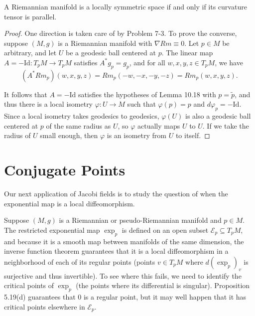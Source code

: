 \begin{theorem}
\label{thm:characterization-locally-symmetric-spaces}
A Riemannian manifold is a locally symmetric space if and only if its curvature tensor is parallel.

\begin{proof}
One direction is taken care of by Problem 7-3. To prove the converse, suppose $(M, g)$ is a Riemannian manifold with $\nabla Rm \equiv 0$. Let $p \in M$ be arbitrary, and let $U$ be a geodesic ball centered at $p$. The linear map $A = -\text{Id}: T_p M \to T_p M$ satisfies $A^* g_p = g_p$, and for all $w, x, y, z \in T_p M$, we have
\[
(A^* Rm_p)(w, x, y, z) = Rm_p(-w, -x, -y, -z) = Rm_p(w, x, y, z).
\]

It follows that $A = -\text{Id}$ satisfies the hypotheses of Lemma 10.18 with $p = \tilde{p}$, and thus there is a local isometry $\varphi: U \to M$ such that $\varphi(p) = p$ and $d\varphi_p = -\text{Id}$. Since a local isometry takes geodesics to geodesics, $\varphi(U)$ is also a geodesic ball centered at $p$ of the same radius as $U$, so $\varphi$ actually maps $U$ to $U$. If we take the radius of $U$ small enough, then $\varphi$ is an isometry from $U$ to itself.
\end{proof}
\end{theorem}

\section{Conjugate Points}

Our next application of Jacobi fields is to study the question of when the exponential map is a local diffeomorphism.

Suppose $(M, g)$ is a Riemannian or pseudo-Riemannian manifold and $p \in M$. The restricted exponential map $\exp_p$ is defined on an open subset $\mathcal{E}_p \subseteq T_p M$, and because it is a smooth map between manifolds of the same dimension, the inverse function theorem guarantees that it is a local diffeomorphism in a neighborhood of each of its regular points (points $v \in T_p M$ where $d(\exp_p)_v$ is surjective and thus invertible). To see where this fails, we need to identify the critical points of $\exp_p$ (the points where its differential is singular). Proposition 5.19(d) guarantees that $0$ is a regular point, but it may well happen that it has critical points elsewhere in $\mathcal{E}_p$.

